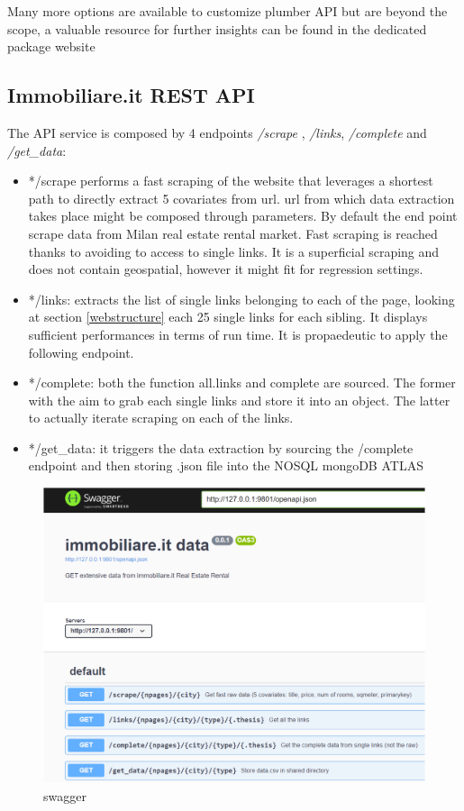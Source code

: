 \documentclass[
  12pt,
  a4paper,
  oneside]{book}
\begin{document}
Many more options are available to customize plumber API but are beyond the scope, a valuable resource for further insights can be found in the dedicated package website \citep{an_api_generator_for_r}

\hypertarget{immobiliare.it-rest-api}{%
\subsection{Immobiliare.it REST API}\label{immobiliare.it-rest-api}}

The API service is composed by 4 endpoints \emph{/scrape} , \emph{/links}, \emph{/complete} and \emph{/get\_data}:

\begin{itemize}
\item
  */scrape performs a fast scraping of the website that leverages a shortest path to directly extract 5 covariates from url. url from which data extraction takes place might be composed through parameters. By default the end point scrape data from Milan real estate rental market. Fast scraping is reached thanks to avoiding to access to single links. It is a superficial scraping and does not contain geospatial, however it might fit for regression settings.
\item
  */links: extracts the list of single links belonging to each of the page, looking at section \ref{webstructure} each 25 single links for each sibling. It displays sufficient performances in terms of run time. It is propaedeutic to apply the following endpoint.
\item
  */complete: both the function all.links and complete are sourced. The former with the aim to grab each single links and store it into an object. The latter to actually iterate scraping on each of the links.
\item
  */get\_data: it triggers the data extraction by sourcing the /complete endpoint and then storing .json file into the NOSQL mongoDB ATLAS
\end{itemize}

\begin{figure}
\centering
\includegraphics{images/swagger.PNG}
\caption{swagger}
\end{figure}
\end{document}
